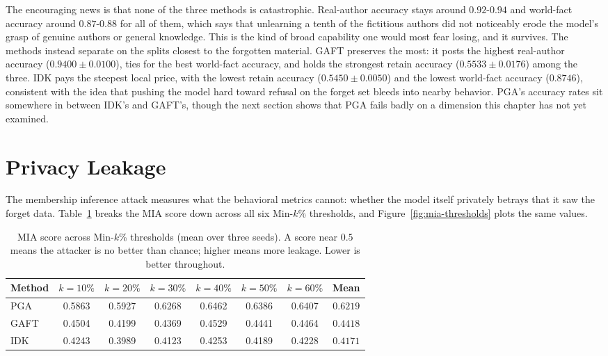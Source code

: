 \documentclass[a4paper,12pt]{report}
\begin{document}
The encouraging news is that none of the three methods is catastrophic. Real-author accuracy stays around $0.92$-$0.94$ and world-fact accuracy around $0.87$-$0.88$ for all of them, which says that unlearning a tenth of the fictitious authors did not noticeably erode the model's grasp of genuine authors or general knowledge. This is the kind of broad capability one would most fear losing, and it survives. The methods instead separate on the splits closest to the forgotten material. GAFT preserves the most: it posts the highest real-author accuracy ($0.9400 \pm 0.0100$), ties for the best world-fact accuracy, and holds the strongest retain accuracy ($0.5533 \pm 0.0176$) among the three. IDK pays the steepest local price, with the lowest retain accuracy ($0.5450 \pm 0.0050$) and the lowest world-fact accuracy ($0.8746$), consistent with the idea that pushing the model hard toward refusal on the forget set bleeds into nearby behavior. PGA's accuracy rates sit somewhere in between IDK's and GAFT's, though the next section shows that PGA fails badly on a dimension this chapter has not yet examined.

\section{Privacy Leakage}
\label{sec:res-privacy}
The membership inference attack measures what the behavioral metrics cannot: whether the model itself privately betrays that it saw the forget data. Table~\ref{tab:mia-thresholds} breaks the MIA score down across all six Min-$k$\% thresholds, and Figure~\ref{fig:mia-thresholds} plots the same values.

\begin{table}[htbp]
	\centering
	\caption{MIA score across Min-$k$\% thresholds (mean over three seeds). A score near $0.5$ means the attacker is no better than chance; higher means more leakage. Lower is better throughout.}
	\label{tab:mia-thresholds}
	\begin{tabular}{lccccccc}
		\toprule
		Method & $k{=}10\%$ & $k{=}20\%$ & $k{=}30\%$ & $k{=}40\%$ & $k{=}50\%$ & $k{=}60\%$ & Mean \\
		\midrule
		PGA  & 0.5863 & 0.5927 & 0.6268 & 0.6462 & 0.6386 & 0.6407 & $0.6219$ \\
		GAFT & 0.4504 & 0.4199 & 0.4369 & 0.4529 & 0.4441 & 0.4464 & $0.4418$ \\
		IDK  & 0.4243 & 0.3989 & 0.4123 & 0.4253 & 0.4189 & 0.4228 & $\mathbf{0.4171}$ \\
		\bottomrule
	\end{tabular}
\end{table}
\end{document}
